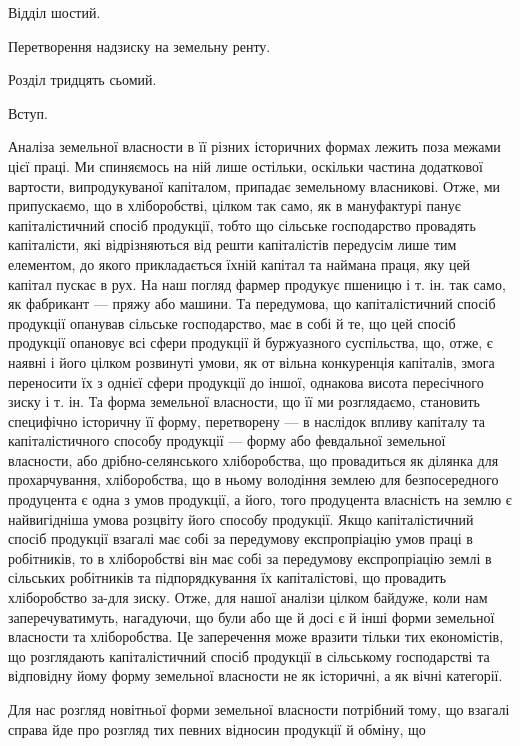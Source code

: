 Відділ шостий.

Перетворення надзиску на
земельну ренту.

Розділ тридцять сьомий.

Вступ.

Аналіза земельної власности в її різних історичних формах лежить поза
межами цієї праці. Ми спиняємось на ній лише остільки, оскільки частина додаткової
вартости, випродукуваної капіталом, припадає земельному власникові.
Отже, ми припускаємо, що в хліборобстві, цілком так само, як в мануфактурі
панує капіталістичний спосіб продукції, тобто що сільське господарство провадять
капіталісти, які відрізняються від решти капіталістів передусім лише тим
елементом, до якого прикладається їхній капітал та наймана праця, яку цей
капітал пускає в рух. На наш погляд фармер продукує пшеницю і т. ін. так
само, як фабрикант — пряжу або машини. Та передумова, що капіталістичний спосіб
продукції опанував сільське господарство, має в собі й те, що цей спосіб продукції
опановує всі сфери продукції й буржуазного суспільства, що, отже,
є наявні і його цілком розвинуті умови, як от вільна конкуренція капіталів,
змога переносити їх з однієї сфери продукції до іншої, однакова висота пересічного
зиску і т. ін. Та форма земельної власности, що її ми розглядаємо,
становить специфічно історичну її форму, перетворену — в наслідок впливу
капіталу та капіталістичного способу продукції — форму або февдальної земельної
власности, або дрібно-селянського хліборобства, що провадиться як ділянка
для прохарчування, хліборобства, що в ньому володіння землею для безпосередного
продуцента є одна з умов продукції, а його, того продуцента власність
на землю є найвигідніша умова розцвіту його способу продукції. Якщо
капіталістичний спосіб продукції взагалі має собі за передумову експропріацію
умов праці в робітників, то в хліборобстві він має собі за передумову
експропріацію землі в сільських робітників та підпорядкування їх капіталістові,
що провадить хліборобство за-для зиску. Отже, для нашої аналізи цілком байдуже,
коли нам заперечуватимуть, нагадуючи, що були або ще й досі є й інші
форми земельної власности та хліборобства. Це заперечення може вразити тільки
тих економістів, що розглядають капіталістичний спосіб продукції в сільському
господарстві та відповідну йому форму земельної власности не як історичні, а як
вічні категорії.

Для нас розгляд новітньої форми земельної власности потрібний тому, що
взагалі справа йде про розгляд тих певних відносин продукції й обміну, що
